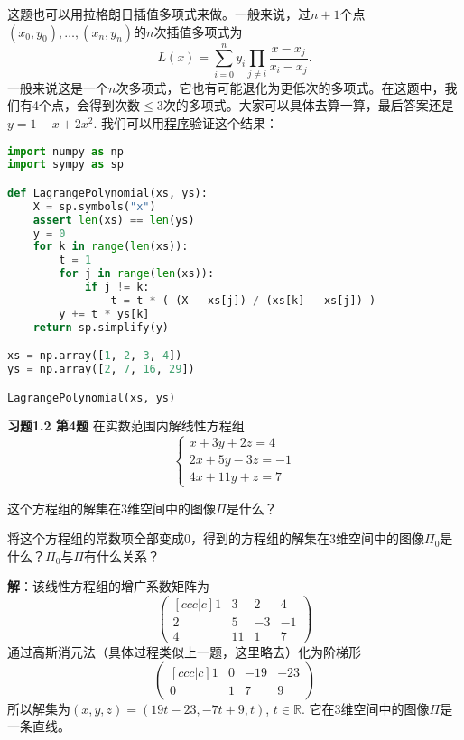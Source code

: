 这题也可以用拉格朗日插值多项式来做。一般来说，过$n+1$个点$(x_0, y_0), \ldots, (x_n, y_n)$的$n$次插值多项式为
$$L(x) = \sum\limits_{i=0}^n y_i \prod\limits_{j \neq i}  \dfrac{x-x_j}{x_i-x_j}.$$
一般来说这是一个$n$次多项式，它也有可能退化为更低次的多项式。在这题中，我们有4个点，会得到次数$\leqslant 3$次的多项式。大家可以具体去算一算，最后答案还是$y = 1 - x + 2x^2$. 我们可以用\href{https://gitee.com/wenh06/buaa-advanced-algebra-2021/blob/master/notebooks/class-1.ipynb}{程序}验证这个结果：
\begin{center}
\begin{lstlisting}[language=Python]
import numpy as np
import sympy as sp

def LagrangePolynomial(xs, ys):
    X = sp.symbols("x")
    assert len(xs) == len(ys)
    y = 0
    for k in range(len(xs)):
        t = 1
        for j in range(len(xs)):
            if j != k:
                t = t * ( (X - xs[j]) / (xs[k] - xs[j]) )
        y += t * ys[k]
    return sp.simplify(y)

xs = np.array([1, 2, 3, 4])
ys = np.array([2, 7, 16, 29])

LagrangePolynomial(xs, ys)
\end{lstlisting}
\end{center}

\newpageorvspace

{\bf 习题1.2 第4题} 在实数范围内解线性方程组
$$\begin{cases}
x + 3y + 2z = 4 \\
2x + 5y -3z = -1 \\
4x + 11y + z = 7
\end{cases}$$

这个方程组的解集在3维空间中的图像$\Pi$是什么？

将这个方程组的常数项全部变成0，得到的方程组的解集在3维空间中的图像$\Pi_0$是什么？$\Pi_0$与$\Pi$有什么关系？

\newpageorvspace

{\bf 解}：该线性方程组的增广系数矩阵为
$$\begin{pmatrix}[ccc|c]
  1 & 3 & 2 & 4\\
  2 & 5 & -3 & -1 \\
  4 & 11 & 1 & 7
\end{pmatrix}$$
通过高斯消元法（具体过程类似上一题，这里略去）化为阶梯形
$$\begin{pmatrix}[ccc|c]
  1 & 0 & -19 & -23\\
  0 & 1 & 7 & 9
\end{pmatrix}$$
所以解集为$(x,y,z) = (19t-23,-7t+9,t)$, $t\in\mathbb{R}$. 它在3维空间中的图像$\Pi$是一条直线。

